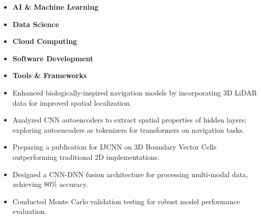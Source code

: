 \begin{itemize}
	\item\bf{AI \& Machine Learning}
	\item\bf{Data Science}
	\item\bf{Cloud Computing}
	\item\bf{Software Development}
	\item\bf{Tools \& Frameworks}
\end{itemize}

\begin{itemize}
	\item Enhanced biologically-inspired navigation models by incorporating 3D LiDAR data for improved spatial localization.
	\item Analyzed CNN autoencoders to extract spatial properties of hidden layers; exploring autoencoders as tokenizers for transformers on navigation tasks.
	\item Preparing a publication for IJCNN on 3D Boundary Vector Cells outperforming traditional 2D implementations.
\end{itemize}


\begin{itemize}
	\item Designed a CNN-DNN fusion architecture for processing multi-modal data, achieving 80\% accuracy.
	\item Conducted Monte Carlo validation testing for robust model performance evaluation.
\end{itemize}


